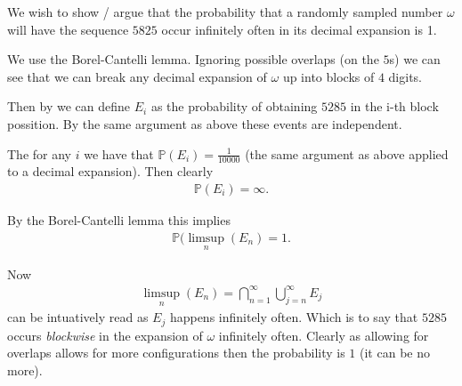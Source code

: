 \documentclass{unswmaths}
\begin{document}
We wish to show / argue that the probability that a randomly sampled number $ \omega $ will have the sequence $ 5825 $ occur infinitely often in its decimal expansion is 1.

We use the Borel-Cantelli lemma. Ignoring possible overlaps (on the $5$s) we can see that we can break any decimal expansion of $ \omega $ up into blocks of $ 4 $ digits. 

Then by we can define $ E_i $ as the probability of obtaining $ 5285 $ in the i-th block possition. By the same argument as above these events are independent.

The for any $ i $ we have that $ \mathbb{P}(E_i) = \frac{1}{10000} $ (the same argument as above applied to a decimal expansion). Then clearly
\begin{align}
  \mathbb{P}( E_i ) = \infty.
\end{align}

By the Borel-Cantelli lemma this implies
\begin{align}
  \mathbb{P}( \limsup_n( E_n ) = 1.
\end{align}

Now 
\begin{align}
  \limsup_n( E_n ) = \bigcap_{n=1}^\infty \bigcup_{j=n}^\infty E_j 
\end{align}
can be intuatively read as $ E_j $ happens infinitely often. Which is to say that $ 5285 $ occurs \emph{blockwise} in the expansion of $ \omega $ infinitely often. Clearly as allowing for overlaps allows for more configurations then the probability is $ 1 $ (it can be no more). 
\end{document}
